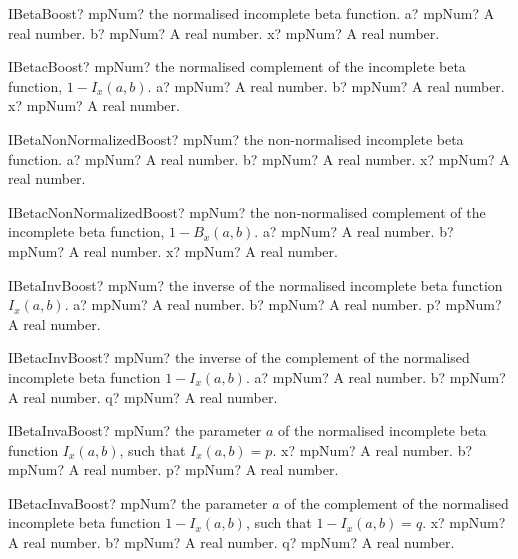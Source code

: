 \documentclass[12pt,a4paper,openany]{book}
\begin{document}
\begin{mpFunctionsExtract}
\mpFunctionThree
{IBetaBoost? mpNum? the normalised incomplete beta function.}
{a? mpNum? A real number.}
{b? mpNum? A real number.}
{x? mpNum? A real number.}
\end{mpFunctionsExtract}

\begin{mpFunctionsExtract}
\mpFunctionThree
{IBetacBoost? mpNum? the normalised complement of the incomplete beta function, $1 - I_x(a,b)$.}
{a? mpNum? A real number.}
{b? mpNum? A real number.}
{x? mpNum? A real number.}
\end{mpFunctionsExtract}

\begin{mpFunctionsExtract}
\mpFunctionThree
{IBetaNonNormalizedBoost? mpNum? the non-normalised incomplete beta function.}
{a? mpNum? A real number.}
{b? mpNum? A real number.}
{x? mpNum? A real number.}
\end{mpFunctionsExtract}

\begin{mpFunctionsExtract}
\mpFunctionThree
{IBetacNonNormalizedBoost? mpNum? the non-normalised complement of the incomplete beta function, $1 - B_x(a,b)$.}
{a? mpNum? A real number.}
{b? mpNum? A real number.}
{x? mpNum? A real number.}
\end{mpFunctionsExtract}

\begin{mpFunctionsExtract}
\mpFunctionThree
{IBetaInvBoost? mpNum? the inverse of the normalised incomplete beta function $I_x(a,b)$.}
{a? mpNum? A real number.}
{b? mpNum? A real number.}
{p? mpNum? A real number.}
\end{mpFunctionsExtract}

\begin{mpFunctionsExtract}
\mpFunctionThree
{IBetacInvBoost? mpNum? the inverse of the complement of the normalised incomplete beta function $1 - I_x(a,b)$.}
{a? mpNum? A real number.}
{b? mpNum? A real number.}
{q? mpNum? A real number.}
\end{mpFunctionsExtract}

\begin{mpFunctionsExtract}
\mpFunctionThree
{IBetaInvaBoost? mpNum? the parameter $a$ of the normalised incomplete beta function $I_x(a,b)$, such that $I_x(a,b) = p$.}
{x? mpNum? A real number.}
{b? mpNum? A real number.}
{p? mpNum? A real number.}
\end{mpFunctionsExtract}

\begin{mpFunctionsExtract}
\mpFunctionThree
{IBetacInvaBoost? mpNum? the parameter $a$ of the complement of the normalised incomplete beta function $1-I_x(a,b)$, such that $1-I_x(a,b) = q$.}
{x? mpNum? A real number.}
{b? mpNum? A real number.}
{q? mpNum? A real number.}
\end{mpFunctionsExtract}
\end{document}
